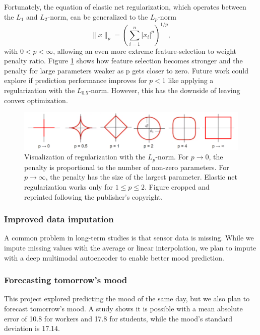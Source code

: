 \documentclass[conference]{IEEEtran}
\begin{document}
Fortunately, the equation of elastic net regularization, which operates between the $L_1$ and $L_2$-norm, can be generalized to the $L_p$-norm
\begin{equation}
\|x\|_{p}=\left(\sum_{i=1}^{n}\left|x_{i}\right|^{p}\right)^{1 / p},
\end{equation}
with $0<p<\infty$, allowing an even more extreme feature-selection to weight penalty ratio.
Figure \ref{fig:reg} shows how feature selection becomes stronger and the penalty for large parameters weaker as p gets closer to zero. Future work could explore if prediction performance improves for $p<1$ like applying a regularization with the $L_{0.5}$-norm. However, this has the downside of leaving convex optimization\cite{xu_l12_2012}.
\begin{figure}[htbp]
\begin{center}
\includegraphics[width=1\linewidth]{figs/Regularization_ Different P-Norms.png}
\caption{Visualization of regularization with the $L_p$-norm. For $p\to 0$, the penalty is proportional to the number of non-zero parameters. For $p\to \infty$, the penalty has the size of the largest parameter. Elastic net regularization works only for $1 \leq p  \leq2$. Figure cropped and reprinted following the publisher's copyright\cite{binz_kevin_intro_2019}.}
\label{fig:reg}
\end{center}
\end{figure}


\subsubsection{Improved data imputation}
 A common problem in long-term studies is that sensor data is missing. While we impute missing values with the average or linear interpolation, we plan to impute with a deep multimodal autoencoder to enable better mood prediction\cite{jaques_multimodal_2017}.
 
 
 \subsubsection{Forecasting tomorrow's mood}
This project explored predicting the mood of the same day, but we also plan to forecast tomorrow's mood. A study shows it is possible with a mean absolute error of 10.8 for workers and 17.8 for students, while the mood's standard deviation is 17.14\cite{umematsu_forecasting_2020}.
\end{document}
